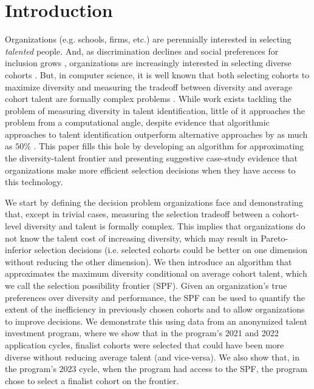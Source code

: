 \section{Introduction}
Organizations (e.g. schools, firms, etc.) are perennially interested in selecting \emph{talented} people. And, as discrimination declines \cite{hsieh2019allocation} and social preferences for inclusion grows \cite{minkin2023diversity}, organizations are increasingly interested in selecting diverse cohorts \cite{dwork2012fairness}. But, in computer science, it is well known that both selecting cohorts to maximize diversity and measuring the tradeoff between diversity and average cohort talent are formally complex problems \cite{nemhauser1978analysis, huppenkothen2020entrofy}. While work exists tackling the problem of measuring diversity in talent identification, little of it approaches the problem from a computational angle, despite evidence that algorithmic approaches to talent identification outperform alternative approaches by as much as $50\%$ \cite{kuncel2013mechanical,li2020hiring}. This paper fills this hole by developing an algorithm for approximating the diversity-talent frontier and presenting suggestive case-study evidence that organizations make more efficient selection decisions when they have access to this technology. 

We start by defining the decision problem organizations face and demonstrating that, except in trivial cases, measuring the selection tradeoff between a cohort-level diversity and talent is formally complex. This implies that organizations do not know the talent cost of increasing diversity, which may result in Pareto-inferior selection decisions (i.e. selected cohorts could be better on one dimension without reducing the other dimension). We then introduce an algorithm that approximates the maximum diversity conditional on average cohort talent, which we call the selection possibility frontier (SPF). Given an organization's true preferences over diversity and performance, the SPF can be used to quantify the extent of the inefficiency in previously chosen cohorts and to allow organizations to improve decisions. We demonstrate this using data from an anonymized talent investment program, where we show that in the program's 2021 and 2022 application cycles, finalist cohorts were selected that could have been more diverse without reducing average talent (and vice-versa). We also show that, in the program's 2023 cycle, when the program had access to the SPF, the program chose to select a finalist cohort on the frontier. 

